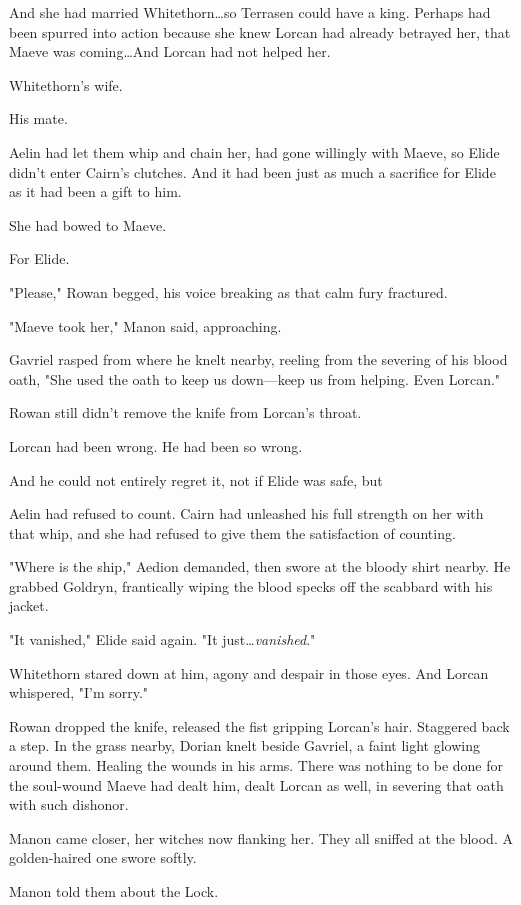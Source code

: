 And she had married Whitethorn\ldots so Terrasen could have a king.
Perhaps had been spurred into action because she knew Lorcan had already betrayed her, that Maeve was coming\ldots And Lorcan had not helped her.

Whitethorn's wife.

His mate.

Aelin had let them whip and chain her, had gone willingly with Maeve, so Elide didn't enter Cairn's clutches.
And it had been just as much a sacrifice for Elide as it had been a gift to him.

She had bowed to Maeve.

For Elide.

"Please," Rowan begged, his voice breaking as that calm fury fractured.

"Maeve took her," Manon said, approaching.

Gavriel rasped from where he knelt nearby, reeling from the severing of his blood oath, "She used the oath to keep us down---keep us from helping.
Even Lorcan."

Rowan still didn't remove the knife from Lorcan's throat.

Lorcan had been wrong.
He had been so wrong.

And he could not entirely regret it, not if Elide was safe, but 

Aelin had refused to count.
Cairn had unleashed his full strength on her with that whip, and she had refused to give them the satisfaction of counting.

"Where is the ship," Aedion demanded, then swore at the bloody shirt nearby.
He grabbed Goldryn, frantically wiping the blood specks off the scabbard with his jacket.

"It vanished," Elide said again.
"It just\ldots \emph{vanished}."

Whitethorn stared down at him, agony and despair in those eyes.
And Lorcan whispered, "I'm sorry."

Rowan dropped the knife, released the fist gripping Lorcan's hair.
Staggered back a step.
In the grass nearby, Dorian knelt beside Gavriel, a faint light glowing around them.
Healing the wounds in his arms.
There was nothing to be done for the soul-wound Maeve had dealt him, dealt Lorcan as well, in severing that oath with such dishonor.

Manon came closer, her witches now flanking her.
They all sniffed at the blood.
A golden-haired one swore softly.

Manon told them about the Lock.

